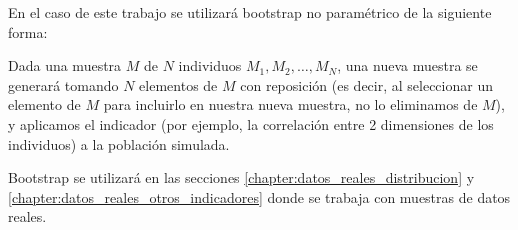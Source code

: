 En el caso de este trabajo se utilizará bootstrap no paramétrico de la siguiente forma:

Dada una muestra $M$ de $N$ individuos $M_1, M_2, \dots, M_N$, una nueva muestra se generará tomando $N$ elementos de $M$ con reposición (es decir, al seleccionar un elemento de $M$ para incluirlo en nuestra nueva muestra, no lo eliminamos de $M$), y aplicamos el indicador (por ejemplo, la correlación entre 2 dimensiones de los individuos) a la población simulada. 

Bootstrap se utilizará en las secciones \ref{chapter:datos_reales_distribucion} y \ref{chapter:datos_reales_otros_indicadores} donde se trabaja con muestras de datos reales.